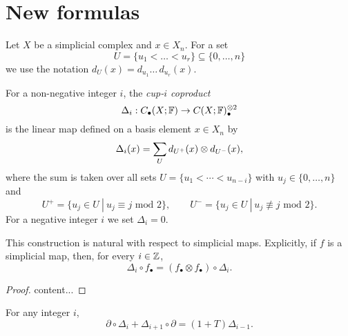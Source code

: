 
\section{New formulas} \label{s:new formulas}

Let $X$ be a simplicial complex and $x \in X_n$. For a set
\begin{equation*}
U = \{u_1 < \dots < u_r\} \subseteq \{0, \dots, n\}
\end{equation*}
we use the notation $d_U(x) = d_{u_1} \ldots\, d_{u_r}(x)$.

\begin{definition} \label{d:cup-i coproducts}	
	For a non-negative integer $i$, the \textit{cup-$i$ coproduct}
	\begin{equation*}
	\Delta_i : C_\bullet(X; \mathbb{F}) \to C(X; \mathbb{F})^{\otimes 2}_\bullet
	\end{equation*}
	is the linear map defined on a basis element $x \in X_n$ by
	\begin{equation} \label{equation: simplicial cup-i coproducts}
	\Delta_i(x) = \sum_U d_{U^+}(x) \otimes d_{U^-}(x),
	\end{equation}
	where the sum is taken over all sets $U = \{u_1 < \cdots < u_{n-i}\}$ with $u_j \in \{0, \dots, n\}$ and
	\begin{equation*}
	U^+ = \{u_j \in U\ |\ u_j \equiv j \text{ mod } 2\}, \qquad
	U^- = \{u_j \in U\ |\ u_j \not\equiv j \text{ mod } 2\}.
	\end{equation*}
	For a negative integer $i$ we set $\Delta_i = 0$.
\end{definition}

\begin{lemma}
	This construction is natural with respect to simplicial maps.
	Explicitly, if $f$ is a simplicial map, then, for every $i \in \mathbb{Z}$,
	\begin{equation*}
	\Delta_i \circ f_\bullet = (f_\bullet \otimes f_\bullet) \circ \Delta_i.
	\end{equation*}
\end{lemma}

\begin{proof}
	content...
\end{proof}

\begin{theorem} \label{t:main}
	For any integer $i$,
	\begin{equation} \label{eq: cup-i coproducts boundary relation}
	\partial \circ \Delta_{i} + \Delta_{i+1} \circ \partial = (1 +T ) \Delta_{i-1}.
	\end{equation}
\end{theorem}

